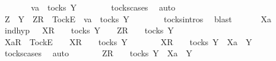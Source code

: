 \ \ \ \ \isamarkupfalse%
\ \isamarkupfalse%
\ {\isachardoublequoteopen}va\ {\isasymin}\ tocks\ Y{\isachardoublequoteclose}\isanewline
\ \ \ \ \ \ \isamarkupfalse%
\ tocks{\isachardot}cases\ \isamarkupfalse%
\ auto\isanewline
\ \ \ \ \isamarkupfalse%
\ \isamarkupfalse%
\ {\isachardoublequoteopen}Z\ {\isasymsubseteq}\ Y\ {\isasymLongrightarrow}\ {\isacharbrackleft}Z{\isacharbrackright}\isactrlsub R\ {\isacharhash}\ {\isacharbrackleft}Tock{\isacharbrackright}\isactrlsub E\ {\isacharhash}\ va\ {\isasymin}\ tocks\ Y{\isachardoublequoteclose}\isanewline
\ \ \ \ \ \ \isamarkupfalse%
\ tocks{\isachardot}intros\ \isamarkupfalse%
\ blast\isanewline
\ \ \isamarkupfalse%
\isanewline
{}\isamarkupfalse%
\isanewline
\ \ \isamarkupfalse%
\ Xa\ {\isasymsigma}{\isacharprime}\isanewline
\ \ \isamarkupfalse%
\ ind{\isacharunderscore}hyp{\isacharcolon}\ {\isachardoublequoteopen}{\isasymsigma}{\isacharprime}\ {\isacharat}\ {\isacharbrackleft}X{\isacharbrackright}\isactrlsub R\ {\isacharhash}\ {\isasymsigma}\ {\isasymin}\ tocks\ Y\ {\isasymLongrightarrow}\ {\isasymsigma}{\isacharprime}\ {\isacharat}\ {\isacharbrackleft}Z{\isacharbrackright}\isactrlsub R\ {\isacharhash}\ {\isasymsigma}\ {\isasymin}\ tocks\ Y{\isachardoublequoteclose}\isanewline
\ \ \isamarkupfalse%
\ {\isachardoublequoteopen}{\isacharbrackleft}Xa{\isacharbrackright}\isactrlsub R\ {\isacharhash}\ {\isacharbrackleft}Tock{\isacharbrackright}\isactrlsub E\ {\isacharhash}\ {\isasymsigma}{\isacharprime}\ {\isacharat}\ {\isacharbrackleft}X{\isacharbrackright}\isactrlsub R\ {\isacharhash}\ {\isasymsigma}\ {\isasymin}\ tocks\ Y{\isachardoublequoteclose}\isanewline
\ \ \isamarkupfalse%
\ \isamarkupfalse%
\ {\isachardoublequoteopen}{\isasymsigma}{\isacharprime}\ {\isacharat}\ {\isacharbrackleft}X{\isacharbrackright}\isactrlsub R\ {\isacharhash}\ {\isasymsigma}\ {\isasymin}\ tocks\ Y\ {\isasymand}\ Xa\ {\isasymsubseteq}\ Y{\isachardoublequoteclose}\isanewline
\ \ \ \ \isamarkupfalse%
\ tocks{\isachardot}cases\ \isamarkupfalse%
\ auto\isanewline
\ \ \isamarkupfalse%
\ \isamarkupfalse%
\ {\isachardoublequoteopen}{\isasymsigma}{\isacharprime}\ {\isacharat}\ {\isacharbrackleft}Z{\isacharbrackright}\isactrlsub R\ {\isacharhash}\ {\isasymsigma}\ {\isasymin}\ tocks\ Y\ {\isasymand}\ Xa\ {\isasymsubseteq}\ Y{\isachardoublequoteclose}\isanewline
